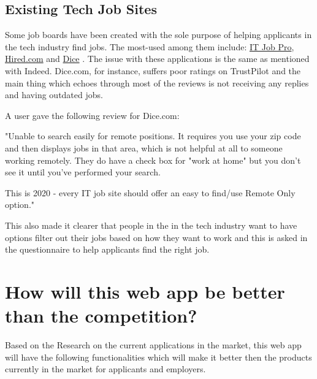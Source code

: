 \subsection{Existing Tech Job Sites}
Some job boards have been created with the sole purpose of helping applicants in the tech industry find jobs. The most-used among them include: \href{https://itjobpro.com}{IT Job Pro}, \href{https://hired.com}{Hired.com} and \href{https://www.dice.com}{Dice} \parencite{Reference38}. The issue with these applications is the same as mentioned with Indeed. Dice.com, for instance, suffers poor ratings on TrustPilot \parencite{Reference39} and the main thing which echoes through most of the reviews is not receiving any replies and having outdated jobs. 

A user gave the following review for Dice.com: 

"Unable to search easily for remote positions. It requires you use your zip code and then displays jobs in that area, which is not helpful at all to someone working remotely. They do have a check box for "work at home" but you don't see it until you've performed your search. 

This is 2020 - every IT job site should offer an easy to find/use Remote Only option."

This also made it clearer that people in the in the tech industry want to have options filter out their jobs based on how they want to work and this is asked in the questionnaire to help applicants find the right job.

\section{How will this web app be better than the competition?}
Based on the Research on the current applications in the market, this web app will have the following functionalities which will make it better then the products currently in the market for applicants and employers.


